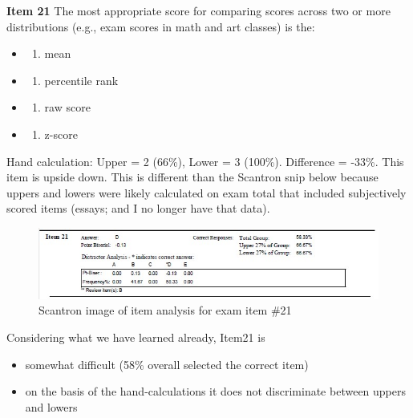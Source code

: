\documentclass[
  english,
]{book}
\providecommand{\tightlist}{%
  \setlength{\itemsep}{0pt}\setlength{\parskip}{0pt}}
\begin{document}
\textbf{Item 21} The most appropriate score for comparing scores across two or more distributions (e.g., exam scores in math and art classes) is the:

\begin{itemize}
\item
  \begin{enumerate}
  \def\labelenumi{\alph{enumi})}
  \tightlist
  \item
    mean
  \end{enumerate}
\item
  \begin{enumerate}
  \def\labelenumi{\alph{enumi})}
  \setcounter{enumi}{1}
  \tightlist
  \item
    percentile rank
  \end{enumerate}
\item
  \begin{enumerate}
  \def\labelenumi{\alph{enumi})}
  \setcounter{enumi}{2}
  \tightlist
  \item
    raw score
  \end{enumerate}
\item
  \begin{enumerate}
  \def\labelenumi{\alph{enumi})}
  \setcounter{enumi}{3}
  \tightlist
  \item
    z-score
  \end{enumerate}
\end{itemize}

Hand calculation: Upper = 2 (66\%), Lower = 3 (100\%). Difference = -33\%. This item is upside down. This is different than the Scantron snip below because uppers and lowers were likely calculated on exam total that included subjectively scored items (essays; and I no longer have that data).

\begin{figure}
\centering
\includegraphics{images/ItemAnalExam/Item21.jpg}
\caption{Scantron image of item analysis for exam item \#21}
\end{figure}

Considering what we have learned already, Item21 is

\begin{itemize}
\tightlist
\item
  somewhat difficult (58\% overall selected the correct item)
\item
  on the basis of the hand-calculations it does not discriminate between uppers and lowers
\end{itemize}
\end{document}
